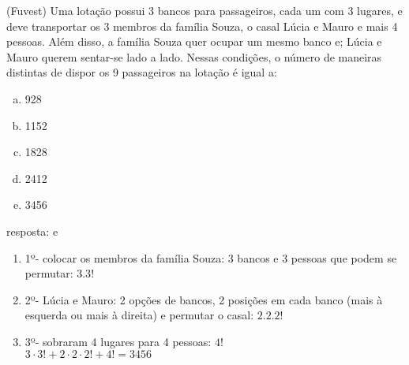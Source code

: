 \begin{ex}
 (Fuvest) Uma lotação possui 3 bancos para passageiros, cada um com 3 lugares, e deve transportar os 3 membros da família Souza, o casal Lúcia e Mauro e mais 4 pessoas. Além disso, a família Souza quer ocupar um mesmo banco e; Lúcia e Mauro querem sentar-se lado a lado.
Nessas condições, o número de maneiras distintas de dispor os 9 passageiros na lotação é igual a:
    \begin{enumerate}[(a)]
    \item 928
    \item 1152
    \item 1828
    \item 2412
    \item 3456
    \end{enumerate}
      \begin{sol}
         resposta: e 
         \begin{enumerate} [--]
             \item 1º- colocar os membros da família Souza: 3 bancos e 3 pessoas que podem se permutar: $3.3!$
             \item 2º- Lúcia e Mauro: 2 opções de bancos, 2 posições em cada banco (mais à esquerda ou mais à direita) e permutar o casal: $2.2.2!$
             \item 3º- sobraram 4 lugares para 4 pessoas: $4!$\\ $3\cdot3!+2\cdot2\cdot2!+4!=3456$
         \end{enumerate}
      \end{sol}
\end{ex}